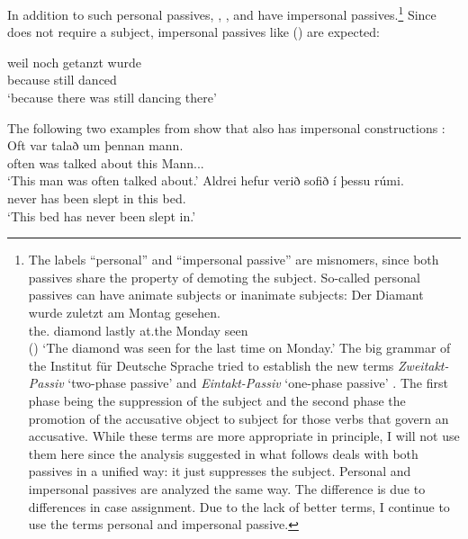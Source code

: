 \noindent
In addition to such personal passives, , , and  have impersonal
passives.\footnote{
The labels ``personal'' and ``impersonal passive'' are misnomers, since both passives share the property of
demoting the subject. So-called personal passives can have animate subjects or inanimate subjects:
\ea 
\gll Der        Diamant wurde  zuletzt am Montag gesehen.\\
     the.\NOM{} diamond \AUX{} lastly at.the Monday seen\\\hfill()
\glt `The diamond was seen for the last time on Monday.'
\z
The big  grammar of the Institut für Deutsche Sprache tried to establish the new terms \emph{Zweitakt-Passiv} `two-phase passive' and
\emph{Eintakt-Passiv} `one-phase passive' \citep[]{Zifonun97b}. The first phase being the suppression of the subject and
the second phase the promotion of the accusative object to subject for those verbs that govern an
accusative. While these terms are more appropriate in principle, I will not use them here since the
analysis suggested in what follows deals with both passives in a unified way: it just suppresses the
subject. Personal and impersonal passives are analyzed the same way. The difference is due to
differences in case assignment. Due to the lack of better terms, I continue to use the terms personal and
impersonal passive.
} Since  does not require a subject, impersonal passives like () are expected:

\ea
\gll weil    noch  getanzt wurde\\
     because still danced  \AUX\\\german
\glt `because there was still dancing there'
\z

\noindent
The following two examples from  show that  also has impersonal constructions \citep[]{Thrainsson2007a-u}:
\eal
\ex 
\gll Oft var   talað      um   þennan mann.\\
     often was talked about this Mann.\ACC.\SG.\M\\\icelandic
\glt `This man was often talked about.'
\ex
\gll Aldrei hefur verið    sofið      í  þessu  rúmi.\\
     never    has   been slept in this bed.\DAT\\
\glt `This bed has never been slept in.'
\zl

